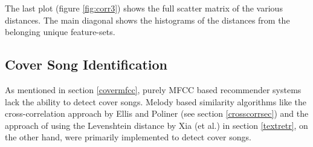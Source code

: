 \noindent The last plot (figure \ref{fig:corr3}) shows the full scatter matrix of the various distances. The main diagonal shows the histograms of the distances from the belonging unique feature-sets.

\begin{figure}[htbp]
	\centering
\end{figure}
\FloatBarrier


\subsection{Cover Song Identification}\label{covsongid}

As mentioned in section \ref{covermfcc}, purely MFCC based recommender systems lack the ability to detect cover songs. Melody based similarity algorithms like the cross-correlation approach by Ellis and Poliner (see section \ref{crosscorrsec}) and the approach of using the Levenshtein distance by Xia (et al.) in section \ref{textretr}, on the other hand, were primarily implemented to detect cover songs. 


